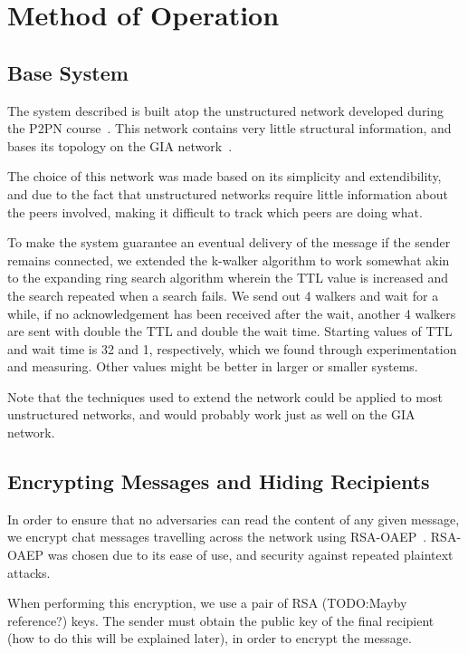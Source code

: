 \section{Method of Operation}

\subsection{Base System}

The system described is built atop the unstructured network developed during the P2PN course~\citep{P2PN}. This network contains very little structural information, and bases its topology on the GIA network~\citep{GIA}.

The choice of this network was made based on its simplicity and extendibility, and due to the fact that unstructured networks require little information about the peers involved, making it difficult to track which peers are doing what. 

To make the system guarantee an eventual delivery of the message if the sender remains connected, we extended the k-walker algorithm to work somewhat akin to the expanding ring search algorithm wherein the TTL value is increased and the search repeated when a search fails. We send out 4 walkers and wait for a while, if no acknowledgement has been received after the wait, another 4 walkers are sent with double the TTL and double the wait time. Starting values of TTL and wait time is 32 and 1, respectively, which we found through experimentation and measuring. Other values might be better in larger or smaller systems.

Note that the techniques used to extend the network could be applied to most unstructured networks, and would probably work just as well on the GIA network.

\subsection{Encrypting Messages and Hiding Recipients}

In order to ensure that no adversaries can read the content of any given message, we encrypt chat messages travelling across the network using RSA-OAEP~\citep{OAEP}. RSA-OAEP was chosen due to its ease of use, and security against repeated plaintext attacks.

When performing this encryption, we use a pair of RSA (TODO:Mayby reference?) keys. The sender must obtain the public key of the final recipient (how to do this will be explained later), in order to encrypt the message.

